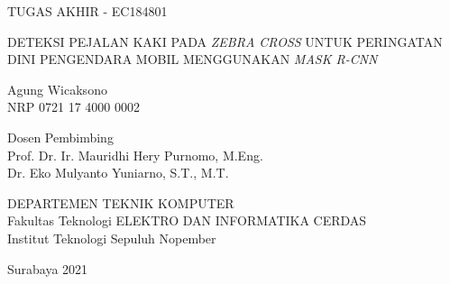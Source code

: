 TUGAS AKHIR - EC184801

\vspace{6ex}

\begin{large}
  DETEKSI PEJALAN KAKI PADA \textit{ZEBRA CROSS} UNTUK PERINGATAN DINI PENGENDARA MOBIL MENGGUNAKAN \textit{MASK R-CNN}
\end{large}

\vspace{4ex}

Agung Wicaksono \\
NRP 0721 17 4000 0002

\vspace{2ex}

Dosen Pembimbing \\
Prof. Dr. Ir. Mauridhi Hery Purnomo, M.Eng.\\
Dr. Eko Mulyanto Yuniarno, S.T., M.T.

\vspace{6ex}

DEPARTEMEN TEKNIK KOMPUTER \\
Fakultas Teknologi ELEKTRO DAN INFORMATIKA CERDAS \\
Institut Teknologi Sepuluh Nopember

Surabaya 2021
